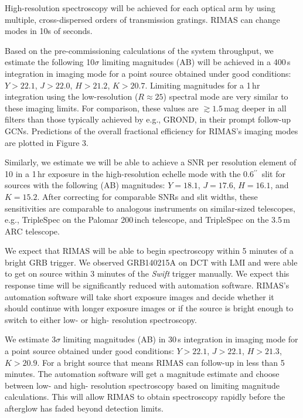 \documentclass[letterpaper,11pt]{article}
\newcommand{\arcsec}{\mbox{$^{\prime\prime}$}}%
\begin{document}
High-resolution spectroscopy will be achieved for each optical arm by using 
multiple, cross-dispersed orders of transmission gratings.  RIMAS
can change modes in 10s of seconds.

\smallskip

Based on the pre-commissioning calculations of the system throughput, we estimate 
the following 10$\sigma$ limiting magnitudes (AB) will be achieved in a 400\,s
integration in imaging mode for a point source obtained under good 
conditions: $Y > 22.1$, $J > 22.0$, $H > 21.2$, $K > 20.7$.  Limiting
magnitudes for a 1\,hr integration using the low-resolution ($R \approx 25$)
spectral mode are very similar to these imaging limits.  For comparison, 
these values are $\gtrsim 1.5$\,mag deeper in all filters than those typically 
achieved by e.g., GROND, in their prompt follow-up GCNs. Predictions of the overall
fractional efficiency for RIMAS's imaging modes are plotted in Figure 3.

Similarly, we estimate we will be able to achieve a SNR per resolution element of 
10 in a 1\,hr exposure in the high-resolution echelle mode with the 0.6\arcsec\ 
slit for sources with the following (AB) magnitudes: $Y = 18.1$, $J = 17.6$, 
$H = 16.1$, and $K = 15.2$.  After correcting for comparable SNRs and slit
widths, these sensitivities are comparable to analogous instruments on 
similar-sized telescopes, e.g., TripleSpec on the Palomar 200\,inch telescope, and
TripleSpec on the 3.5\,m ARC telescope.

\smallskip

We expect that RIMAS will be able to begin spectroscopy within 5 minutes of a bright GRB trigger.
We observed GRB140215A on DCT with LMI and were able to get on source 
within 3 minutes of the \textit{Swift} trigger manually.  We expect this response time will be significantly reduced with 
automation software.  RIMAS's automation software will take short exposure images and 
decide whether it should continue with longer exposure images or if the source is bright 
enough to switch to either low- or high- resolution spectroscopy.

We estimate 3$\sigma$ limiting magnitudes (AB) in 30\,s integration 
in imaging mode for a point source obtained under good conditions: 
$Y > 22.1$, $J > 22.1$, $H > 21.3$, $K > 20.9$.  For a bright source that means RIMAS can
follow-up in less than 5 minutes.  The automation software will get a magnitude estimate and 
choose between low- and high- resolution spectroscopy based on limiting magnitude calculations.
This will allow RIMAS to obtain spectroscopy rapidly before the afterglow has faded beyond detection limits.
\end{document}
